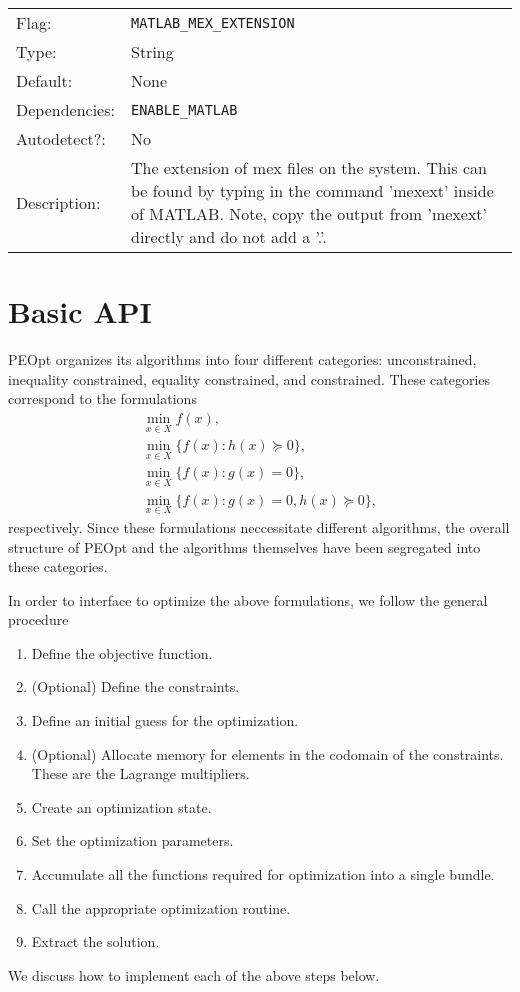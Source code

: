 \documentclass{report}
\begin{document}
\begin{center}
\begin{longtable}{lp{}}
\\
Flag:         &\texttt{MATLAB\_MEX\_EXTENSION}\\
Type:         &String \\
Default:      &None \\
Dependencies: &\texttt{ENABLE\_MATLAB}\\
Autodetect?:  &No \\
Description:  &The extension of mex files on the system.  This can be found
              by typing in the command 'mexext' inside of MATLAB.  Note, copy
              the output from 'mexext' directly and do not add a '.'.
\end{longtable}
\end{center}
       
\chapter{Basic API}\label{ch:Basic}

       PEOpt organizes its algorithms into four different categories: unconstrained, inequality constrained, equality constrained, and constrained.  These categories correspond to the formulations
$$\begin{array}{l}
    \min\limits_{x\in X} f(x),\\
    \min\limits_{x\in X} \{ f(x) : h(x)\succeq 0\},\\
    \min\limits_{x\in X} \{ f(x) : g(x)=0 \},\\
    \min\limits_{x\in X} \{ f(x) : g(x)=0, h(x)\succeq 0 \},
\end{array}$$
respectively.  Since these formulations neccessitate different algorithms, the overall structure of PEOpt and the algorithms themselves have been segregated into these categories.

        In order to interface to optimize the above formulations, we follow the general procedure
\begin{enumerate}
    \item Define the objective function.
    \item (Optional) Define the constraints.
    \item Define an initial guess for the optimization.
    \item (Optional) Allocate memory for elements in the codomain of the constraints.  These are the Lagrange multipliers. 
    \item Create an optimization state.
    \item Set the optimization parameters.
    \item Accumulate all the functions required for optimization into a single bundle.
    \item Call the appropriate optimization routine.
    \item Extract the solution.
\end{enumerate}
We discuss how to implement each of the above steps below. 
\end{document}
